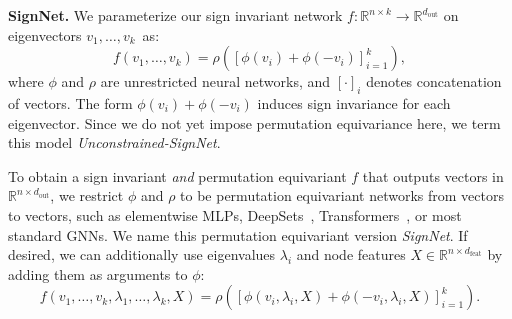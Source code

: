 \documentclass{article} \usepackage{iclr2023_conference,times}
\newcommand{\RR}{\mathbb R}
\newcommand{\mrm}[1]{\mathrm{#1}}
\newcommand{\dout}{d_{\mrm{out}}}
\newcommand{\dfeat}{d_{\mrm{feat}}}
\begin{document}
\textbf{SignNet.} We parameterize our sign invariant network $f: \RR^{n \times k} \to \RR^{\dout}$ on eigenvectors $v_1, \ldots, v_k$~as:
\begin{equation}
    f(v_1, \ldots, v_k) = \rho\left([\phi(v_i) + \phi(-v_i)]_{i=1}^k \right),
\end{equation}
where $\phi$ and $\rho$ are unrestricted neural networks, and $[\cdot]_i$ denotes concatenation of vectors. The form $\phi(v_i) + \phi(-v_i)$ induces sign invariance for each eigenvector. Since we do not yet impose permutation equivariance here, we term this model \emph{Unconstrained-SignNet}.


To obtain a sign invariant \emph{and} permutation equivariant $f$ that outputs vectors in $\RR^{n \times \dout}$, we restrict $\phi$ and $\rho$ to be permutation equivariant networks from vectors to vectors, such as elementwise MLPs, DeepSets~\citep{zaheer2017deep}, Transformers~\citep{vaswani2017attention}, or most standard GNNs. We name this permutation equivariant version \textit{SignNet}. If desired, we can additionally use eigenvalues $\lambda_i$ and node features $X \in \RR^{n \times \dfeat}$ by adding them as arguments to $\phi$:
\begin{equation}
    f(v_1, \ldots, v_k, \lambda_1, \ldots, \lambda_k, X) = \rho\left([\phi(v_i, \lambda_i, X) + \phi(-v_i, \lambda_i, X)]_{i=1}^k \right).
\end{equation}
\end{document}

